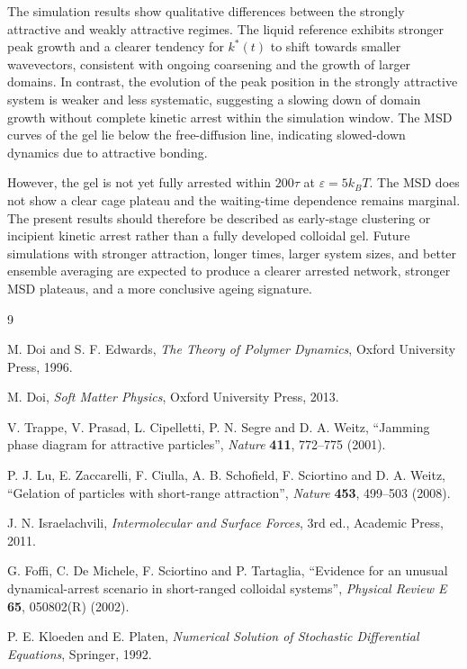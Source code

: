 \documentclass[11pt,a4paper]{article}
\begin{document}
The simulation results show qualitative differences between the strongly attractive and weakly attractive regimes. The liquid reference exhibits stronger peak growth and a clearer tendency for $k^\ast(t)$ to shift towards smaller wavevectors, consistent with ongoing coarsening and the growth of larger domains. In contrast, the evolution of the peak position in the strongly attractive system is weaker and less systematic, suggesting a slowing down of domain growth without complete kinetic arrest within the simulation window. The MSD curves of the gel lie below the free-diffusion line, indicating slowed-down dynamics due to attractive bonding.

However, the gel is not yet fully arrested within $200\tau$ at $\varepsilon=5k_BT$. The MSD does not show a clear cage plateau and the waiting-time dependence remains marginal. The present results should therefore be described as early-stage clustering or incipient kinetic arrest rather than a fully developed colloidal gel. Future simulations with stronger attraction, longer times, larger system sizes, and better ensemble averaging are expected to produce a clearer arrested network, stronger MSD plateaus, and a more conclusive ageing signature.

\begin{thebibliography}{9}

M. Doi and S. F. Edwards,
\textit{The Theory of Polymer Dynamics},
Oxford University Press, 1996.

M. Doi,
\textit{Soft Matter Physics},
Oxford University Press, 2013.

V. Trappe, V. Prasad, L. Cipelletti, P. N. Segre and D. A. Weitz,
``Jamming phase diagram for attractive particles'',
\textit{Nature} \textbf{411}, 772--775 (2001).

P. J. Lu, E. Zaccarelli, F. Ciulla, A. B. Schofield, F. Sciortino and D. A. Weitz,
``Gelation of particles with short-range attraction'',
\textit{Nature} \textbf{453}, 499--503 (2008).

J. N. Israelachvili,
\textit{Intermolecular and Surface Forces}, 3rd ed.,
Academic Press, 2011.

G. Foffi, C. De Michele, F. Sciortino and P. Tartaglia,
``Evidence for an unusual dynamical-arrest scenario in short-ranged colloidal systems'',
\textit{Physical Review E} \textbf{65}, 050802(R) (2002).

P. E. Kloeden and E. Platen,
\textit{Numerical Solution of Stochastic Differential Equations},
Springer, 1992.

\end{thebibliography}
\end{document}
